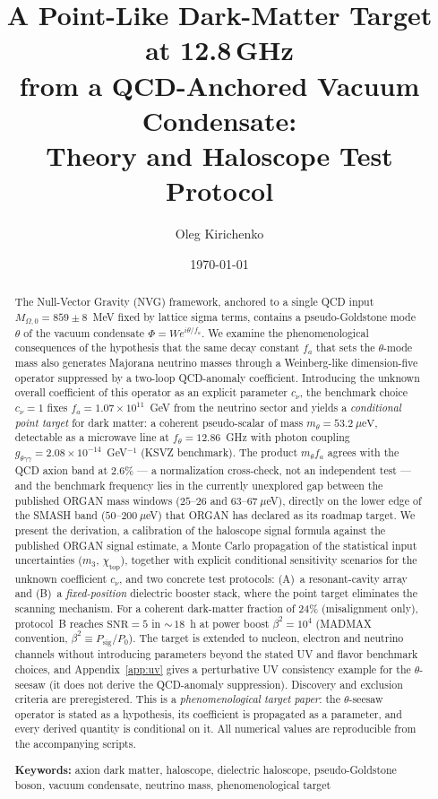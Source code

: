 \documentclass[11pt,a4paper]{article}
\title{\textbf{A Point-Like Dark-Matter Target at 12.8\,GHz\\
from a QCD-Anchored Vacuum Condensate:\\
Theory and Haloscope Test Protocol}}
\author{Oleg Kirichenko}
\affil{Independent Researcher; \texttt{urevich55@gmail.com}\\
\url{https://github.com/infosave2007/vmf}}
\date{\today}
\begin{document}
\maketitle

\begin{abstract}
The Null-Vector Gravity (NVG) framework, anchored to a single QCD input
$M_{\Omega,0} = 859 \pm 8$~MeV fixed by lattice sigma terms, contains a
pseudo-Goldstone mode $\theta$ of the vacuum condensate $\Phi = W e^{i\theta/f_a}$.
We examine the phenomenological consequences of the hypothesis that the same
decay constant $f_a$ that sets the $\theta$-mode mass also generates Majorana
neutrino masses through a Weinberg-like dimension-five operator suppressed by
a two-loop QCD-anomaly coefficient. Introducing the unknown overall coefficient
of this operator as an explicit parameter $c_\nu$, the benchmark choice
$c_\nu = 1$ fixes $f_a = 1.07\times 10^{11}$~GeV from the neutrino sector and
yields a \emph{conditional point target} for dark matter: a coherent
pseudo-scalar of mass $m_\theta = 53.2~\mu\text{eV}$, detectable as a
microwave line at $f_\theta = 12.86$~GHz with photon coupling
$g_{\theta\gamma\gamma} = 2.08\times 10^{-14}$~GeV$^{-1}$ (KSVZ benchmark).
The product $m_\theta f_a$ agrees with the QCD axion band at 2.6\% --- a
normalization cross-check, not an independent test --- and the benchmark
frequency lies in the currently unexplored gap between the published ORGAN
mass windows ($25$--$26$ and $63$--$67~\mu$eV), directly on the lower edge of
the SMASH band ($50$--$200~\mu$eV) that ORGAN has declared as its roadmap
target. We present the derivation, a calibration of the haloscope signal
formula against the published ORGAN signal estimate, a Monte Carlo
propagation of the statistical input uncertainties ($m_3$,
$\chi_{\mathrm{top}}$), together with explicit conditional sensitivity
scenarios for the unknown coefficient $c_\nu$, and two concrete test
protocols: (A)~a
resonant-cavity array and (B)~a \emph{fixed-position} dielectric booster
stack, where the point target eliminates the scanning mechanism. For a
coherent dark-matter fraction of 24\% (misalignment only), protocol~B reaches
$\text{SNR}=5$ in ${\sim}\,18$~h at power boost $\beta^2 = 10^4$ (MADMAX
convention, $\beta^2 \equiv P_{\mathrm{sig}}/P_0$). The target is extended
to nucleon, electron and neutrino channels without introducing parameters
beyond the stated UV and flavor benchmark choices, and Appendix~\ref{app:uv}
gives a perturbative UV consistency
example for the $\theta$-seesaw (it does not derive the QCD-anomaly
suppression). Discovery and exclusion
criteria are preregistered. This is a \emph{phenomenological target paper}:
the $\theta$-seesaw operator is stated as a hypothesis, its coefficient is
propagated as a parameter, and every derived quantity is conditional on it.
All numerical values are reproducible from the accompanying scripts.

\medskip
\noindent\textbf{Keywords:} axion dark matter, haloscope, dielectric haloscope,
pseudo-Goldstone boson, vacuum condensate, neutrino mass, phenomenological target
\end{abstract}
\end{document}
